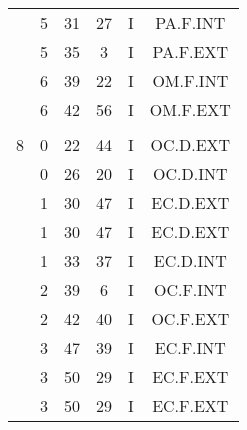 \documentclass[12pt, a4paper]{article}
\begin{document}
\begin{multicols}{3}
{\begin{tabular}{c c c c c c}
	 	 	 	 & 5 & 31 & 27 & I & PA.F.INT\\%
	 	 	 	 & 5 & 35 & 3 & I & PA.F.EXT\\%
	 	 	 	 & 6 & 39 & 22 & I & OM.F.INT\\%
	 	 	 	 & 6 & 42 & 56 & I & OM.F.EXT\\%
	 	 	 	 & & & & & \\%
	 	 	 	8 & 0 & 22 & 44 & I & OC.D.EXT\\%
	 	 	 	 & 0 & 26 & 20 & I & OC.D.INT\\%
	 	 	 	 & 1 & 30 & 47 & I & EC.D.EXT\\%
	 	 	 	 & 1 & 30 & 47 & I & EC.D.EXT\\%
	 	 	 	 & 1 & 33 & 37 & I & EC.D.INT\\%
	 	 	 	 & 2 & 39 & 6 & I & OC.F.INT\\%
	 	 	 	 & 2 & 42 & 40 & I & OC.F.EXT\\%
	 	 	 	 & 3 & 47 & 39 & I & EC.F.INT\\%
	 	 	 	 & 3 & 50 & 29 & I & EC.F.EXT\\%
	 	 	 	 & 3 & 50 & 29 & I & EC.F.EXT\\%
	 	 \end{tabular}
 	}
\end{multicols}
\end{document}
